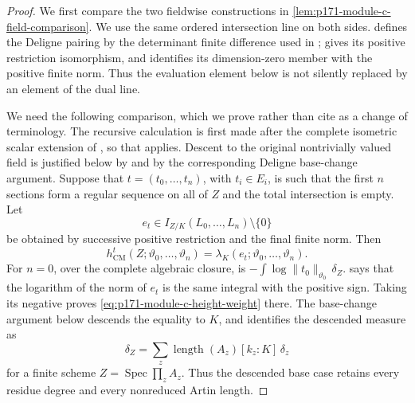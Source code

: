\begin{proof}
We first compare the two fieldwise constructions in
\cref{lem:p171-module-c-field-comparison}.  We use the same ordered
intersection line on both sides.  \cite[Section~8.3 and Appendix~A]{BE21}
defines the Deligne pairing by the determinant finite difference used in
\cite{Ducrot97CubeIntersection}; \cite[Theorem~A.22]{BE21} gives its
positive restriction isomorphism, and \cite[Example~8.15]{BE21} identifies
its dimension-zero member with the positive finite norm.  Thus the
evaluation element below is not silently replaced by an element of the dual
line.

We need the following comparison, which we prove rather than cite as a
change of terminology.  The recursive calculation is first made after the
complete isometric scalar extension of
\cite[Definition~3.6.1]{ChenMoriwaki21AdelicIntersection}, so that
\cite[Remark~3.7.3 and formula~(3.16)]{ChenMoriwaki21AdelicIntersection}
applies.  Descent to the original nontrivially valued field is justified
below by
\cite[Proposition~3.8.9 and Remark~3.8.10]{ChenMoriwaki21AdelicIntersection}
and by the corresponding Deligne base-change argument.  Suppose that
\(t=(t_0,\ldots,t_n)\), with \(t_i\in E_i\), is such that the first
\(n\) sections form a regular sequence on all of \(Z\) and the total
intersection is empty.  Let
\[
 e_t\in I_{Z/K}(L_0,\ldots,L_n)\setminus\{0\}
\]
be obtained by successive positive restriction and the final finite norm.
Then
\begin{equation}
 h^{t}_{\mathrm{CM}}(Z;\vartheta_0,\ldots,\vartheta_n)
 =\lambda_K(e_t;\vartheta_0,\ldots,\vartheta_n).
 \label{eq:p171-module-c-height-weight}
\end{equation}
For \(n=0\), over the complete algebraic closure,
\cite[formula~(3.15)]{ChenMoriwaki21AdelicIntersection} is
\(-\int\log\lVert t_0\rVert_{\vartheta_0}\,\delta_Z\).
\cite[Theorem~8.16, formula~(8.11)]{BE21} says that the logarithm of the norm
of \(e_t\) is the same integral with the positive sign.  Taking its negative
proves \eqref{eq:p171-module-c-height-weight} there.  The base-change
argument below descends the equality to \(K\), and
\cite[Example~8.2]{BE21} identifies the descended measure as
\[
 \delta_Z=\sum_z\operatorname{length}(A_z)[k_z:K]\,\delta_z
\]
for a finite scheme \(Z=\operatorname{Spec}\prod_zA_z\).  Thus the descended
base case retains every residue degree and every nonreduced Artin length.


\end{proof}
